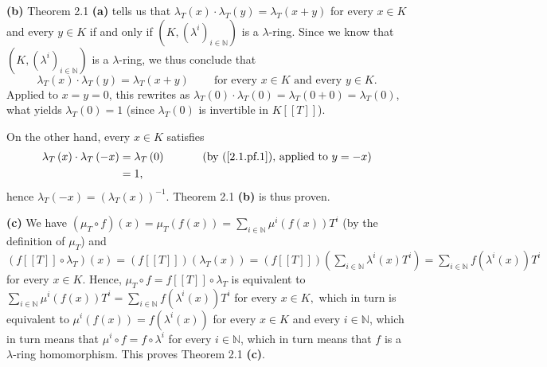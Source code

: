\documentclass[numbers=enddot,12pt,final,onecolumn,notitlepage]{scrartcl}%
\begin{document}
\textbf{(b)} Theorem 2.1 \textbf{(a)} tells us that $\lambda_{T}\left(
x\right)  \cdot\lambda_{T}\left(  y\right)  =\lambda_{T}\left(  x+y\right)  $
for every $x\in K$ and every $y\in K$ if and only if $\left(  K,\left(
\lambda^{i}\right)  _{i\in\mathbb{N}}\right)  $ is a $\lambda$-ring. Since we
know that $\left(  K,\left(  \lambda^{i}\right)  _{i\in\mathbb{N}}\right)  $
is a $\lambda$-ring, we thus conclude that
\begin{equation}
\lambda_{T}\left(  x\right)  \cdot\lambda_{T}\left(  y\right)  =\lambda
_{T}\left(  x+y\right)  \ \ \ \ \ \ \ \ \ \ \text{for every }x\in K\text{ and
every }y\in K. \label{2.1.pf.1}%
\end{equation}
Applied to $x=y=0$, this rewrites as $\lambda_{T}\left(  0\right)
\cdot\lambda_{T}\left(  0\right)  =\lambda_{T}\left(  0+0\right)  =\lambda
_{T}\left(  0\right)  $, what yields $\lambda_{T}\left(  0\right)  =1$ (since
$\lambda_{T}\left(  0\right)  $ is invertible in $K\left[  \left[  T\right]
\right]  $).

On the other hand, every $x\in K$ satisfies
\begin{align*}
\lambda_{T}\left(  x\right)  \cdot\lambda_{T}\left(  -x\right)   &
=\lambda_{T}\left(  0\right)  \ \ \ \ \ \ \ \ \ \ \left(  \text{by
(\ref{2.1.pf.1}), applied to }y=-x\right) \\
&  =1,
\end{align*}
hence $\lambda_{T}\left(  -x\right)  =\left(  \lambda_{T}\left(  x\right)
\right)  ^{-1}$. Theorem 2.1 \textbf{(b)} is thus proven.

\textbf{(c)} We have $\left(  \mu_{T}\circ f\right)  \left(  x\right)
=\mu_{T}\left(  f\left(  x\right)  \right)  =\sum\limits_{i\in\mathbb{N}}%
\mu^{i}\left(  f\left(  x\right)  \right)  T^{i}$ (by the definition of
$\mu_{T}$) and $\left(  f\left[  \left[  T\right]  \right]  \circ\lambda
_{T}\right)  \left(  x\right)  =\left(  f\left[  \left[  T\right]  \right]
\right)  \left(  \lambda_{T}\left(  x\right)  \right)  =\left(  f\left[
\left[  T\right]  \right]  \right)  \left(  \sum\limits_{i\in\mathbb{N}%
}\lambda^{i}\left(  x\right)  T^{i}\right)  =\sum\limits_{i\in\mathbb{N}%
}f\left(  \lambda^{i}\left(  x\right)  \right)  T^{i}$ for every $x\in K$.
Hence, $\mu_{T}\circ f=f\left[  \left[  T\right]  \right]  \circ\lambda_{T}$
is equivalent to $\sum\limits_{i\in\mathbb{N}}\mu^{i}\left(  f\left(
x\right)  \right)  T^{i}=\sum\limits_{i\in\mathbb{N}}f\left(  \lambda
^{i}\left(  x\right)  \right)  T^{i}$ for every $x\in K,$ which in turn is
equivalent to $\mu^{i}\left(  f\left(  x\right)  \right)  =f\left(
\lambda^{i}\left(  x\right)  \right)  $ for every $x\in K$ and every
$i\in\mathbb{N}$, which in turn means that $\mu^{i}\circ f=f\circ\lambda^{i}$
for every $i\in\mathbb{N}$, which in turn means that $f$ is a $\lambda$-ring
homomorphism. This proves Theorem 2.1 \textbf{(c)}.
\end{document}
